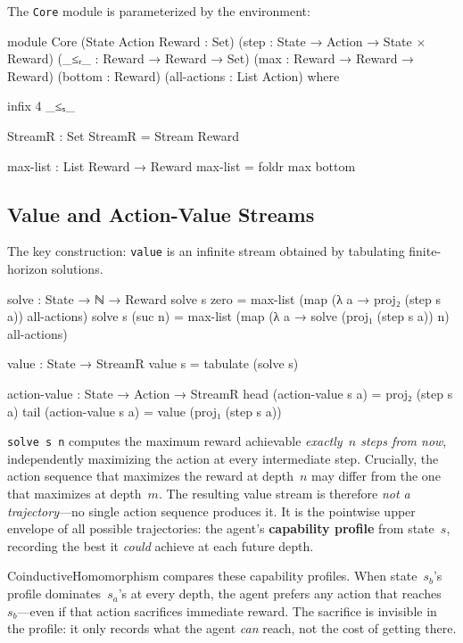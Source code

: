 \documentclass[9pt,a4paper]{article}
\theoremstyle{plain}
\theoremstyle{definition}
\theoremstyle{remark}
\begin{document}
The \texttt{Core} module is parameterized by the environment:

\begin{code}
module Core
  (State Action Reward : Set)
  (step                : State → Action → State × Reward)
  (_≤ᵣ_                : Reward → Reward → Set)
  (max                 : Reward → Reward → Reward)
  (bottom              : Reward)
  (all-actions         : List Action)
  where

  infix 4 _≤ₛ_

  StreamR : Set
  StreamR = Stream Reward

  max-list : List Reward → Reward
  max-list = foldr max bottom
\end{code}

\subsection{Value and Action-Value Streams}

The key construction: \texttt{value} is an infinite stream obtained by tabulating finite-horizon solutions.

\begin{code}
  solve : State → ℕ → Reward
  solve s zero    = max-list (map (λ a → proj₂ (step s a)) all-actions)
  solve s (suc n) = max-list (map (λ a → solve (proj₁ (step s a)) n) all-actions)

  value : State → StreamR
  value s = tabulate (solve s)

  action-value : State → Action → StreamR
  head (action-value s a) = proj₂ (step s a)
  tail (action-value s a) = value (proj₁ (step s a))
\end{code}

\noindent \texttt{solve~s~n} computes the maximum reward achievable \emph{exactly~$n$ steps from now}, independently maximizing the action at every intermediate step.  Crucially, the action sequence that maximizes the reward at depth~$n$ may differ from the one that maximizes at depth~$m$.  The resulting value stream is therefore \emph{not a trajectory}---no single action sequence produces it.  It is the pointwise upper envelope of all possible trajectories: the agent's \textbf{capability profile} from state~$s$, recording the best it \emph{could} achieve at each future depth.

CoinductiveHomomorphism compares these capability profiles.  When state~$s_b$'s profile dominates~$s_a$'s at every depth, the agent prefers any action that reaches~$s_b$---even if that action sacrifices immediate reward.  The sacrifice is invisible in the profile: it only records what the agent \emph{can} reach, not the cost of getting there.
\end{document}
